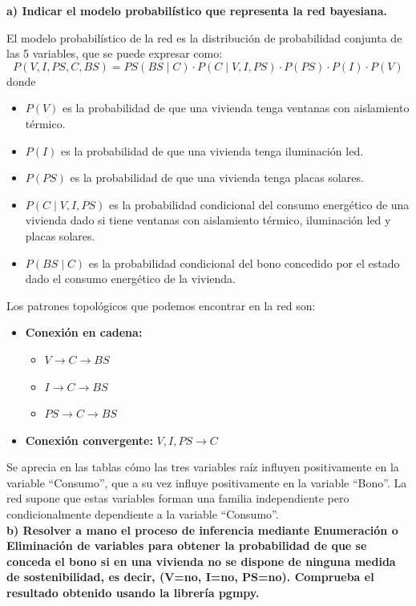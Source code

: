 \documentclass[11pt,a4paper]{article}
\begin{document}
\textbf{a) Indicar el modelo probabilístico que representa la red bayesiana.}

El modelo probabilístico de la red es la distribución de probabilidad conjunta de las 5 variables, que se puede expresar
como:
\begin{equation*}
    P(V, I, PS, C, BS) = PS(BS \mid C ) \cdot P(C \mid V, I, PS) \cdot P(PS) \cdot P(I) \cdot P(V)
\end{equation*}
donde
\begin{itemize}
    \item $P(V)$ es la probabilidad de que una vivienda tenga ventanas con aislamiento térmico.
    \item $P(I)$ es la probabilidad de que una vivienda tenga iluminación led.
    \item $P(PS)$ es la probabilidad de que una vivienda tenga placas solares.
    \item $P(C \mid V, I, PS)$ es la probabilidad condicional del consumo energético de una vivienda dado si tiene
    ventanas con aislamiento térmico, iluminación led y placas solares.
    \item $P(BS \mid C)$ es la probabilidad condicional del bono concedido por el estado dado el consumo energético
    de la vivienda.
\end{itemize}
Los patrones topológicos que podemos encontrar en la red son:
\begin{itemize}
    \item \textbf{Conexión en cadena:} 
        \begin{itemize}
            \item $V \rightarrow C \rightarrow BS$
            \item $I \rightarrow C \rightarrow BS$
            \item $PS \rightarrow C \rightarrow BS$
        \end{itemize}
    \item \textbf{Conexión convergente:} $V, I, PS \rightarrow C$
\end{itemize}
Se aprecia en las tablas cómo las tres variables raíz influyen positivamente en la variable ``Consumo'', que a su vez influye
positivamente en la variable ``Bono''. La red supone que estas variables forman una
familia independiente pero condicionalmente dependiente a la variable ``Consumo''. \\

\textbf{b) Resolver a mano el proceso de inferencia mediante Enumeración o Eliminación de variables para obtener
la probabilidad de que se conceda el bono si en una vivienda no se dispone de ninguna medida de
sostenibilidad, es decir, (V=no, I=no, PS=no). Comprueba el resultado obtenido usando la librería pgmpy.}
\end{document}
